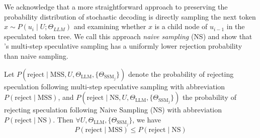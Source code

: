 We acknowledge that a more straightforward approach to preserving the probability distribution of stochastic decoding is directly sampling the next token $x \sim P(u_i \mid U; \Theta_{LLM})$ and examining whether $x$ is a child node of $u_{i-1}$ in the speculated token tree. We call this approach {\em naive sampling} (NS) and show that \SpecInfer's multi-step speculative sampling has a uniformly lower rejection probability than naive sampling.

\begin{theorem}
\label{specinfer:theorem:MSS}
    Let $P\left(\textrm{reject} \mid \textrm{MSS}, U, \Theta_{\textrm{LLM}}, \{\Theta_{\textrm{SSM}_j}\} \right)$ denote the probability of rejecting speculation following multi-step speculative sampling with abbreviation $P(\textrm{reject}\mid \textrm{MSS})$, and $P\left(\textrm{reject} \mid \textrm{NS}, U, \Theta_{\textrm{LLM}}, \{\Theta_{\textrm{SSM}_j}\}\right)$ the probability of rejecting speculation following Naive Sampling (NS) with abbreviation $P(\textrm{reject}\mid\textrm{NS})$. Then $\forall U, \Theta_{\textrm{LLM}}, \{\Theta_{\textrm{SSM}_j}\}$, we have $$P(\textrm{reject}\mid \textrm{MSS}) \leq P(\textrm{reject}\mid\textrm{NS})$$
\end{theorem}


